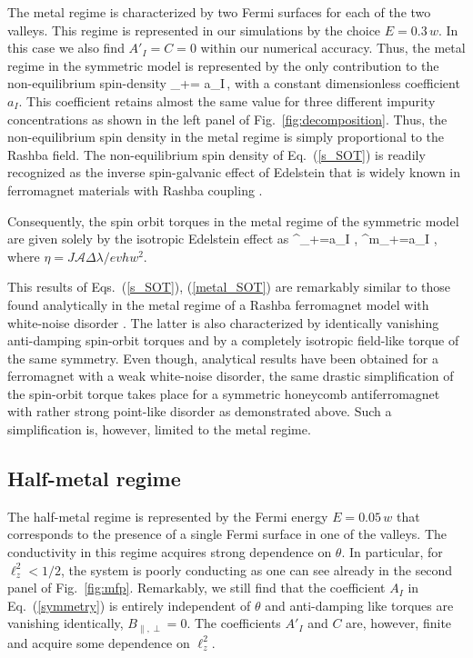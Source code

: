 The metal regime is characterized by two Fermi surfaces for each of the two valleys. This regime is represented in our simulations by the choice $E=0.3\,w$. In this case we also find $A'_I=C=0$ within our numerical accuracy. Thus, the metal regime in the symmetric model is represented by the only contribution to the non-equilibrium spin-density
\be
\label{s_SOT}
\delta{}_+=  a_I\,\times {}, 
\e
with a constant dimensionless coefficient $a_I$. This coefficient retains almost the same value for three different impurity concentrations as 
shown in the left panel of Fig.~\ref{fig:decomposition}. Thus, the non-equilibrium spin density in the metal regime is simply proportional to the Rashba field. The non-equilibrium spin density of Eq.~(\ref{s_SOT}) is readily recognized as the inverse spin-galvanic effect of Edelstein \cite{Edelstein1990} that is widely known in ferromagnet materials with Rashba coupling \cite{ManchonPRB2008, GarateSOT2009}. 

Consequently, the spin orbit torques in the metal regime of the symmetric model are given solely by the isotropic Edelstein effect as
\be
\label{metal_SOT}
^\ell_+=a_I \eta\;\bb{\ell} \times{},\quad
{}^m_+=a_I \eta\; \!\times\!, 
\e
where $\eta=J\mathcal{A}\Delta\lambda /evh w^2$. 

This results of Eqs.~(\ref{s_SOT}), (\ref{metal_SOT}) are remarkably similar to those found analytically in the metal regime of a Rashba ferromagnet model with white-noise disorder \cite{AdoSOT2017,AdoSTTGD2019}. The latter is also characterized by identically vanishing anti-damping spin-orbit torques and by a completely isotropic field-like torque of the same symmetry. Even though, analytical results have been obtained for a ferromagnet with a weak white-noise disorder, the same drastic simplification of the spin-orbit torque takes place for a symmetric honeycomb antiferromagnet with rather strong point-like disorder as demonstrated above. Such a simplification is, however, limited to the metal regime. 
 
\subsection{Half-metal regime} 
 
The half-metal regime is represented by the Fermi energy $E=0.05\,w$ that corresponds to the presence of a single Fermi surface in one of the valleys. The conductivity in this regime acquires strong dependence on $\theta$. In particular, for $\ell_z^2<1/2$, the system is poorly conducting as one can see already in the second panel of Fig.~\ref{fig:mfp}. Remarkably, we still find that the coefficient $A_I$ in Eq.~(\ref{symmetry}) is entirely independent of $\theta$ and anti-damping like torques are vanishing identically, $B_{\parallel,\perp}=0$. The coefficients $A'_I$ and $C$ are, however, finite and acquire some dependence on $\ell_z^2$.   

